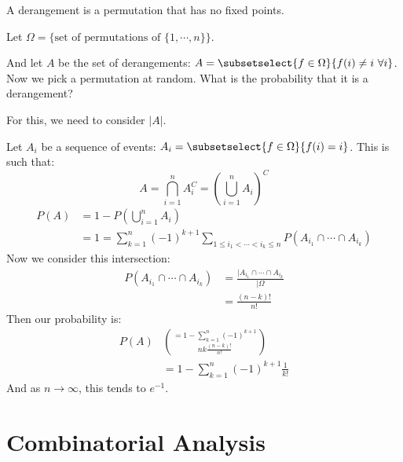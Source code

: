 \documentclass[../Main.tex]{subfiles}
\begin{document}
\begin{example}
    A derangement is a permutation that has no fixed points.\par
    Let $\Omega = \{\text{set of permutations of } \{1, \cdots, n\}\}$.\par
    And let $A$ be the set of derangements: $A = \subsetselect{f \in \Omega}{f(i) \neq i~\forall i}$.
    Now we pick a permutation at random. What is the probability that it is a derangement?\par
    For this, we need to consider $|A|$.\par
    Let $A_i$ be a sequence of events: $A_i = \subsetselect{f \in \Omega}{f(i) = i}$. This is such that:
    \begin{equation*}
        A = \bigcap_{i=1}^n A_i^C = \left(\bigcup_{i=1}^n A_i\right)^C
    \end{equation*}
    \begin{align*}
        P(A) &= 1- P\left(\bigcup_{i=1}^n A_i\right) \\
        &= 1 = \sum_{k=1}^{n} (-1)^{k+1} \sum_{1 \leq i_1 < \cdots < i_k \leq n} P(A_{i_1} \cap \cdots \cap A_{i_k})
    \end{align*}
    Now we consider this intersection:
    \begin{align*}
        P(A_{i_1} \cap \cdots \cap A_{i_k}) &= \frac{|A_{i_1} \cap \cdots \cap A_{i_k}}{|\Omega} \\
        &= \frac{(n-k)!}{n!}
    \end{align*}
    Then our probability is:
    \begin{align*}
        P(A) &= 1 - \sum_{k=1}^n (-1)^{k+1} \choose{n}{k} \frac{(n-k)!}{n!} \\
        &= 1 - \sum_{k=1}^n (-1)^{k+1} \frac{1}{k!}
    \end{align*}
    And as $n \to \infty$, this tends to $e^{-1}$.
\end{example}
\section{Combinatorial Analysis}
\end{document}
